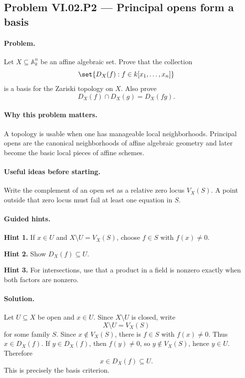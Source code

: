 \subsection*{Problem VI.02.P2 --- Principal opens form a basis}
\label{prob:vi02-p2}

\paragraph{Problem.}
Let \(X\subseteq\mathbb A_k^n\) be an affine algebraic set.  Prove that the collection
\[
\set{D_X(f):f\in k[x_1,\dots,x_n]}
\]
is a basis for the Zariski topology on \(X\).  Also prove
\[
D_X(f)\cap D_X(g)=D_X(fg).
\]

\ifdefined\FullProblemDossiers
\paragraph{Why this problem matters.}
A topology is usable when one has manageable local neighborhoods.  Principal opens are the
canonical neighborhoods of affine algebraic geometry and later become the basic local pieces
of affine schemes.

\paragraph{Useful ideas before starting.}
Write the complement of an open set as a relative zero locus \(V_X(S)\).  A point outside
that zero locus must fail at least one equation in \(S\).

\paragraph{Guided hints.}
\textbf{Hint 1.} If \(x\in U\) and \(X\setminus U=V_X(S)\), choose \(f\in S\) with
\(f(x)\neq0\).

\textbf{Hint 2.} Show \(D_X(f)\subseteq U\).

\textbf{Hint 3.} For intersections, use that a product in a field is nonzero exactly when
both factors are nonzero.

\paragraph{Solution.}
Let \(U\subseteq X\) be open and \(x\in U\).  Since \(X\setminus U\) is closed, write
\[
X\setminus U=V_X(S)
\]
for some family \(S\).  Since \(x\notin V_X(S)\), there is \(f\in S\) with
\(f(x)\neq0\).  Thus \(x\in D_X(f)\).  If \(y\in D_X(f)\), then \(f(y)\neq0\), so
\(y\notin V_X(S)\), hence \(y\in U\).  Therefore
\[
x\in D_X(f)\subseteq U.
\]
This is precisely the basis criterion.

